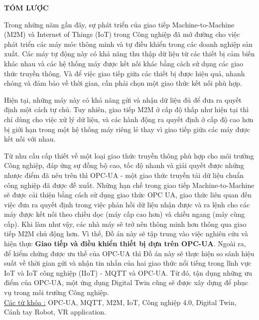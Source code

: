 \newpage
\vspace*{0.5cm}
\begin{center}
    \textbf{TÓM LƯỢC}
\end{center}

Trong những năm gần đây, sự phát triển của giao tiếp Machine-to-Machine (M2M) và Internet of Things (IoT) trong Công nghiệp đã mở đường cho việc phát triển các máy móc thông minh và tự điều khiển trong các doanh nghiệp sản xuất. Các máy tự động này có khả năng thu thập dữ liệu từ các thiết bị cảm biến khác nhau và các hệ thống máy được kết nối khác bằng cách sử dụng các giao thức truyền thông. Và để việc giao tiếp giữa các thiết bị được hiệu quả, nhanh chóng và đảm bảo về thời gian, cần phải chọn một giao thức kết nối phù hợp.

Hiện tại, những máy này có khả năng gửi và nhận dữ liệu đủ để đưa ra quyết định một cách tự chủ. Tuy nhiên, giao tiếp M2M ở cấp độ thấp như hiện tại thì chỉ dùng cho việc xử lý dữ liệu, và các hành động ra quyết định ở cấp độ cao hơn bị giới hạn trong một hệ thống máy riêng lẻ thay vì giao tiếp giữa các máy được kết nối với nhau. 

Từ nhu cầu cấp thiết về một loại giao thức truyền thông phù hợp cho môi trường Công nghiệp, đáp ứng sự đồng bộ cao, tốc độ nhanh và giải quyết được những nhược điểm đã nêu trên thì OPC-UA - một giao thức truyền tải dữ liệu chuẩn công nghiệp đã được đề xuất. Những hạn chế trong giao tiếp Machine-to-Machine sẽ được cải thiện bằng cách sử dụng giao thức OPC UA, giao thức liên quan đến việc đưa ra quyết định trong việc phản hồi dữ liệu nhận được và ra lệnh cho các máy được kết nối theo chiều dọc (máy cấp cao hơn) và chiều ngang (máy cùng cấp). Khi làm như vậy, các nhà máy sẽ trở nên thông minh hơn thông qua giao tiếp M2M chủ động hơn. Vì thế, Đồ án này sẽ tập trung vào việc nghiên cứu và hiện thực \textbf{Giao tiếp và điều khiển thiết bị dựa trên OPC-UA}.  Ngoài ra, để kiểm chứng được ưu thế của OPC-UA thì Đồ án này sẽ thực hiện so sánh hiệu suất về thời gian gửi và nhận tin nhắn của hai giao thức nổi tiếng trong lĩnh vực IoT và IoT công nghiệp (IIoT) - MQTT và OPC-UA. Từ đó, tận dụng những ưu điểm của OPC-UA, một ứng dụng Digital Twin cũng sẽ được xây dựng để phục vụ trong môi trường Công nghiệp.  \\

\underline{Các từ khóa :} OPC-UA, MQTT, M2M, IoT, Công nghiệp 4.0, Digital Twin, Cánh tay Robot, VR application.